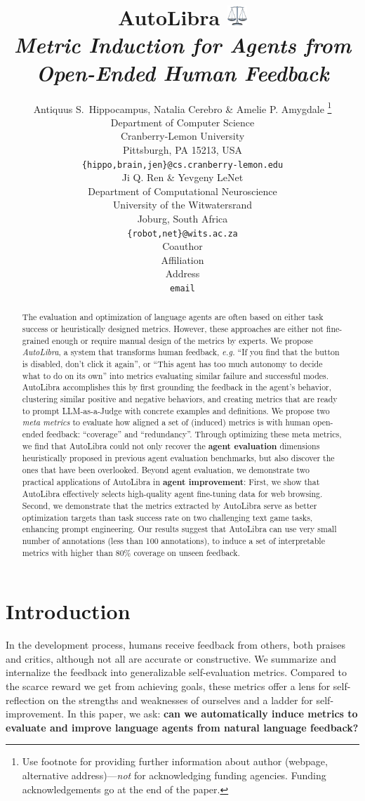 \documentclass{article} %
\title{AutoLibra \protect\includegraphics[height=1em]{figs/scale.png} \\ \textit{Metric Induction for Agents from Open-Ended Human Feedback}}
\author{Antiquus S.~Hippocampus, Natalia Cerebro \& Amelie P. Amygdale \thanks{ Use footnote for providing further information
about author (webpage, alternative address)---\emph{not} for acknowledging
funding agencies.  Funding acknowledgements go at the end of the paper.} \\
Department of Computer Science\\
Cranberry-Lemon University\\
Pittsburgh, PA 15213, USA \\
\texttt{\{hippo,brain,jen\}@cs.cranberry-lemon.edu} \\
\And
Ji Q. Ren \& Yevgeny LeNet \\
Department of Computational Neuroscience \\
University of the Witwatersrand \\
Joburg, South Africa \\
\texttt{\{robot,net\}@wits.ac.za} \\
\AND
Coauthor \\
Affiliation \\
Address \\
\texttt{email}
}
\begin{document}
\ifcolmsubmission
\linenumbers
\fi

\maketitle

\begin{abstract}
The evaluation and optimization of language agents are often based on either
task success or heuristically designed metrics.
However, these approaches are either not fine-grained enough or require 
manual design of the metrics by experts.
We propose \emph{AutoLibra},
a system that transforms human feedback, 
\emph{e.g.} ``\textsf{If you find that the button is disabled, don't click it again}'',
or ``\textsf{This agent has too much autonomy to decide what to do on its own}''
into metrics evaluating similar failure and successful modes.
AutoLibra accomplishes this by first grounding the feedback in the agent's behavior,
clustering similar positive and negative behaviors,
and creating metrics that are ready to prompt LLM-as-a-Judge with
concrete examples and definitions. 
We propose two \emph{meta metrics} to evaluate how aligned a set of (induced) metrics
is with human open-ended feedback: ``coverage'' and ``redundancy''.
Through optimizing these meta metrics, we find that AutoLibra could
not only recover the \textbf{agent evaluation} dimensions heuristically proposed
in previous agent evaluation benchmarks, but also discover the ones that have been overlooked.
Beyond agent evaluation, we demonstrate two practical applications of
AutoLibra in \textbf{agent improvement}:
First, we show that AutoLibra effectively selects high-quality agent fine-tuning data
for web browsing. Second, we demonstrate that the metrics extracted by AutoLibra serve
as better optimization targets than task success rate on two challenging text game tasks,
enhancing prompt engineering.
Our results suggest that AutoLibra can use very small number of annotations (less than 100 annotations), 
to induce a set of interpretable metrics with higher than 80\% coverage on unseen feedback.
\end{abstract}

\section{Introduction}
In the development process, humans receive feedback from others,
both praises and critics, although not all are accurate or constructive.
We summarize and internalize the feedback into
generalizable self-evaluation metrics. Compared to the scarce reward
we get from achieving goals, these metrics offer a lens for self-reflection on the
strengths and weaknesses of ourselves and a ladder for self-improvement.
In this paper, we ask:
\textbf{can we automatically induce metrics to evaluate and improve language agents from natural language feedback?} 
\end{document}

